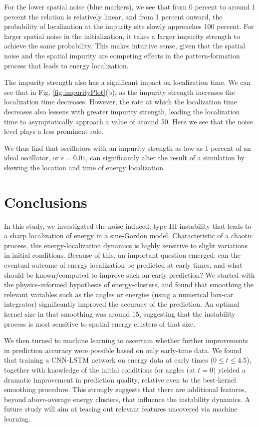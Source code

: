 \documentclass[11pt]{article}
\begin{document}
For the lower spatial noise (blue markers), we see that from 0 percent to around 1 percent the relation is relatively linear, and from 1 percent onward, the probability of localization at the impurity site slowly approaches 100 percent. 
For larger spatial noise in the initialization, it takes a larger impurity strength to achieve the same probability. This makes intuitive sense, given that the spatial noise and the spatial impurity are competing effects in the pattern-formation process that leads to energy localization.

The impurity strength also has a significant impact on localization time. We can see that in Fig. \ref{fig:impurityPlot}(b), as the impurity strength increases the localization time decreases. However, the rate at which the localization time decreases also lessens with greater impurity strength, leading the localization time to asymptotically approach a value of around 50. Here we see that the noise level plays a less prominent role.

We thus find that oscillators with an impurity strength as low as 1 percent of an ideal oscillator, or $\epsilon=0.01$, can significantly alter the result of a simulation by skewing the location and time of energy localization. 

\section{Conclusions}
In this study, we investigated the noise-induced, type III instability that leads to a sharp localization of energy in a sine-Gordon model. Characteristic of a chaotic process, this energy-localization dynamics is highly sensitive to slight variations in initial conditions. Because of this, an important question emerged: can the eventual outcome of energy localization be predicted at early times, and what should be known/computed to improve such an early prediction? We started with the physics-informed hypothesis of energy-clusters, and found that smoothing the relevant variables such as the angles or energies (using a numerical box-car integrator) significantly improved the accuracy of the prediction. An optimal kernel size in that smoothing was around 15, suggesting that the instability process is most sensitive to spatial energy clusters of that size. 

We then turned to machine learning to ascertain whether further improvements in prediction accuracy were possible based on only early-time data. We found that training a CNN-LSTM network on energy data at early times ($0\le t \le 4.5$), together with knowledge of the initial conditions for angles (at $t=0$) yielded a dramatic improvement in prediction quality, relative even to the best-kernel smoothing procedure. This strongly suggests that there are additional features, beyond above-average energy clusters, that influence the instability dynamics. A future study will aim at teasing out relevant features uncovered via machine learning.
\end{document}
